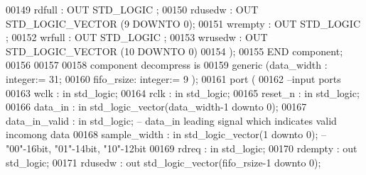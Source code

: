 \begin{DoxyCode}
00149         rdfull  : \textcolor{keywordflow}{OUT} \textcolor{comment}{STD\_LOGIC} ;
00150         rdusedw : \textcolor{keywordflow}{OUT} \textcolor{comment}{STD\_LOGIC\_VECTOR} (\textcolor{vhdllogic}{}\textcolor{vhdllogic}{9} \textcolor{keywordflow}{DOWNTO} \textcolor{vhdllogic}{}\textcolor{vhdllogic}{0});
00151         wrempty : \textcolor{keywordflow}{OUT} \textcolor{comment}{STD\_LOGIC} ;
00152         wrfull  : \textcolor{keywordflow}{OUT} \textcolor{comment}{STD\_LOGIC} ;
00153         wrusedw : \textcolor{keywordflow}{OUT} \textcolor{comment}{STD\_LOGIC\_VECTOR} (\textcolor{vhdllogic}{}\textcolor{vhdllogic}{10} \textcolor{keywordflow}{DOWNTO} \textcolor{vhdllogic}{}\textcolor{vhdllogic}{0})
00154     );
00155 \textcolor{keywordflow}{END} \textcolor{keywordflow}{component};
00156 
00157 
00158 \textcolor{keywordflow}{component} decompress \textcolor{keywordflow}{is}
00159   \textcolor{keywordflow}{generic} (data_width : \textcolor{comment}{integer}:= \textcolor{vhdllogic}{}\textcolor{vhdllogic}{31};
00160           fifo_rsize: \textcolor{comment}{integer}:= \textcolor{vhdllogic}{}\textcolor{vhdllogic}{9} );
00161   \textcolor{keywordflow}{port} (
00162 \textcolor{keyword}{        --input ports }
00163         wclk          : \textcolor{keywordflow}{in} \textcolor{comment}{std\_logic};
00164         rclk          : \textcolor{keywordflow}{in} \textcolor{comment}{std\_logic};
00165         reset_n       : \textcolor{keywordflow}{in} \textcolor{comment}{std\_logic};
00166         data_in       : \textcolor{keywordflow}{in} \textcolor{comment}{std\_logic\_vector}(data_width\textcolor{vhdlchar}{-}\textcolor{vhdllogic}{}\textcolor{vhdllogic}{1} \textcolor{keywordflow}{downto} \textcolor{vhdllogic}{}\textcolor{vhdllogic}{0});
00167         data_in_valid : \textcolor{keywordflow}{in} \textcolor{comment}{std\_logic}; \textcolor{keyword}{-- data\_in leading signal which indicates valid incomong data}
00168         sample_width  : \textcolor{keywordflow}{in} \textcolor{comment}{std\_logic\_vector}(\textcolor{vhdllogic}{}\textcolor{vhdllogic}{1} \textcolor{keywordflow}{downto} \textcolor{vhdllogic}{}\textcolor{vhdllogic}{0}); \textcolor{keyword}{-- "00"-16bit, "01"-14bit, "10"-12bit}
00169         rdreq         : \textcolor{keywordflow}{in} \textcolor{comment}{std\_logic};
00170         rdempty       : \textcolor{keywordflow}{out} \textcolor{comment}{std\_logic};
00171         rdusedw       : \textcolor{keywordflow}{out} \textcolor{comment}{std\_logic\_vector}(fifo_rsize\textcolor{vhdlchar}{-}\textcolor{vhdllogic}{}\textcolor{vhdllogic}{1} \textcolor{keywordflow}{downto} \textcolor{vhdllogic}{}\textcolor{vhdllogic}{0});

\end{DoxyCode}
